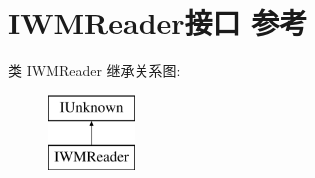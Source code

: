\hypertarget{interface_i_w_m_reader}{}\section{I\+W\+M\+Reader接口 参考}
\label{interface_i_w_m_reader}
类 I\+W\+M\+Reader 继承关系图\+:\begin{figure}[H]
\begin{center}
\leavevmode
\includegraphics[height=2.000000cm]{interface_i_w_m_reader}
\end{center}
\end{figure}
